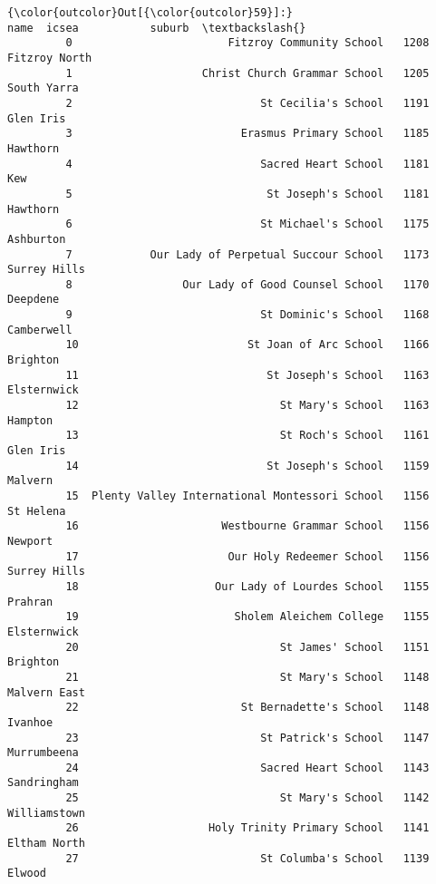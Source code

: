 \documentclass[11pt]{article}
\begin{document}
\begin{Verbatim}[commandchars=\\\{\}]
{\color{outcolor}Out[{\color{outcolor}59}]:}                                              name  icsea           suburb  \textbackslash{}
         0                        Fitzroy Community School   1208    Fitzroy North   
         1                    Christ Church Grammar School   1205      South Yarra   
         2                             St Cecilia's School   1191        Glen Iris   
         3                          Erasmus Primary School   1185         Hawthorn   
         4                             Sacred Heart School   1181              Kew   
         5                              St Joseph's School   1181         Hawthorn   
         6                             St Michael's School   1175        Ashburton   
         7            Our Lady of Perpetual Succour School   1173     Surrey Hills   
         8                 Our Lady of Good Counsel School   1170         Deepdene   
         9                             St Dominic's School   1168       Camberwell   
         10                          St Joan of Arc School   1166         Brighton   
         11                             St Joseph's School   1163      Elsternwick   
         12                               St Mary's School   1163          Hampton   
         13                               St Roch's School   1161        Glen Iris   
         14                             St Joseph's School   1159          Malvern   
         15  Plenty Valley International Montessori School   1156        St Helena   
         16                      Westbourne Grammar School   1156          Newport   
         17                       Our Holy Redeemer School   1156     Surrey Hills   
         18                     Our Lady of Lourdes School   1155          Prahran   
         19                        Sholem Aleichem College   1155      Elsternwick   
         20                               St James' School   1151         Brighton   
         21                               St Mary's School   1148     Malvern East   
         22                         St Bernadette's School   1148          Ivanhoe   
         23                            St Patrick's School   1147      Murrumbeena   
         24                            Sacred Heart School   1143      Sandringham   
         25                               St Mary's School   1142     Williamstown   
         26                    Holy Trinity Primary School   1141     Eltham North   
         27                            St Columba's School   1139           Elwood   

\end{Verbatim}
\end{document}

